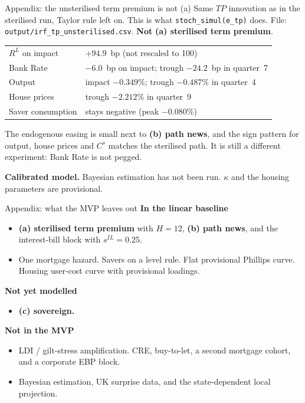 \documentclass[11pt,aspectratio=169]{beamer}
\newcommand{\Calibrated}{%
  \par\vspace{0.2em}%
  {\footnotesize\textbf{Calibrated model.}
  Bayesian estimation has not been run.
  $\kappa$ and the housing parameters are provisional.}%
}
\begin{document}
\begin{frame}{Appendix: the unsterilised term premium is not (a)}
  Same $TP$ innovation as in the sterilised run, Taylor rule left on.
  This is what \texttt{stoch\_simul(e\_tp)} does.
  File: \texttt{output/irf\_tp\_unsterilised.csv}.
  \textbf{Not} \textbf{(a) sterilised term premium}.
  \vspace{0.4em}
  {\footnotesize
  \begin{tabular}{@{}ll@{}}
    \toprule
    $R^{L}$ on impact & $+94.9$~bp (not rescaled to 100) \\
    Bank Rate & $-6.0$~bp on impact; trough $-24.2$~bp in quarter~7 \\
    Output & impact $-0.349\%$; trough $-0.487\%$ in quarter~4 \\
    House prices & trough $-2.212\%$ in quarter~9 \\
    Saver consumption & stays negative (peak $-0.080\%$) \\
    \bottomrule
  \end{tabular}
  }
  \vspace{0.45em}
  {\scriptsize
  The endogenous easing is small next to \textbf{(b) path news},
  and the sign pattern for output, house prices and $C^{s}$ matches
  the sterilised path. It is still a different experiment:
  Bank Rate is not pegged.}
  \Calibrated
\end{frame}

\begin{frame}{Appendix: what the MVP leaves out}
  \textbf{In the linear baseline}
  \begin{itemize}
    \item \textbf{(a) sterilised term premium} with $H=12$,
          \textbf{(b) path news}, and the interest-bill block with
          $s^{IL}=0.25$.
    \item One mortgage hazard. Savers on a level rule. Flat provisional
          Phillips curve. Housing user-cost curve with provisional loadings.
  \end{itemize}
  \textbf{Not yet modelled}
  \begin{itemize}
    \item \textbf{(c) sovereign.}
  \end{itemize}
  \textbf{Not in the MVP}
  \begin{itemize}
    \item LDI / gilt-stress amplification. CRE, buy-to-let, a second
          mortgage cohort, and a corporate EBP block.
    \item Bayesian estimation, UK surprise data, and the state-dependent
          local projection.
  \end{itemize}
\end{frame}
\end{document}
